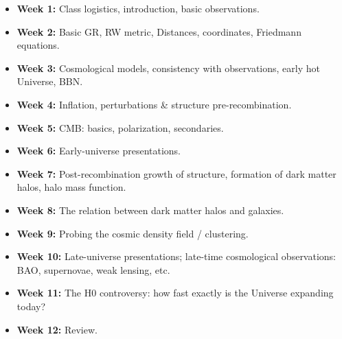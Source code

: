 \documentclass{article}
\begin{document}
\begin{itemize}

  \item {\bf Week 1:} Class logistics, introduction, basic observations.

  \item {\bf Week 2:} Basic GR, RW metric, Distances, coordinates, Friedmann 
    equations.

  \item {\bf Week 3:} Cosmological models, consistency with observations, 
  early hot Universe, BBN.

  \item {\bf Week 4:} Inflation, perturbations \& structure pre-recombination.

  \item {\bf Week 5:} CMB: basics, polarization, secondaries.

  \item {\bf Week 6:} Early-universe presentations.

  \item {\bf Week 7:} Post-recombination growth of structure, formation of dark 
  matter halos, halo mass function.

  \item {\bf Week 8:} The relation between dark matter halos and galaxies.

  \item {\bf Week 9:} Probing the cosmic density field / clustering.

  \item {\bf Week 10:} Late-universe presentations; late-time cosmological 
  observations: BAO, supernovae, weak lensing, etc.

  \item {\bf Week 11:} The H0 controversy: how fast exactly is the Universe 
  expanding today?

  \item {\bf Week 12:} Review.

\end{itemize}
\end{document}
